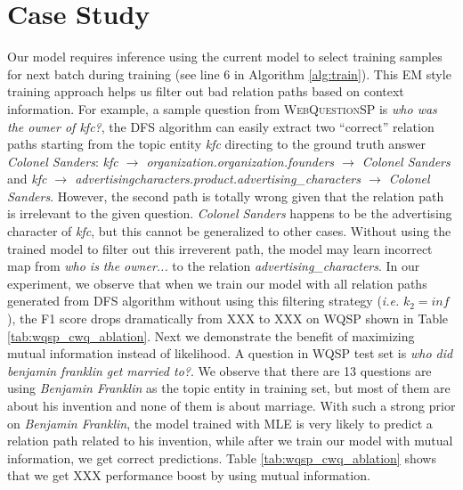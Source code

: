 \section{Case Study}


Our model requires inference using the current model to select training samples for next batch during training (see line 6 in Algorithm \ref{alg:train}). This EM style training approach helps us filter out bad relation paths based on context information. For example, a sample question from \textsc{WebQuestionSP} is \textit{who was the owner of kfc?}, the DFS algorithm can easily extract two ``correct'' relation paths starting from the topic entity \textit{kfc} directing to the ground truth answer \textit{Colonel Sanders}: \textit{kfc $\rightarrow$ organization.organization.founders $\rightarrow$ Colonel Sanders} and \textit{kfc $\rightarrow$ advertisingcharacters.product.advertising\_characters $\rightarrow$ Colonel Sanders}. However, the second path is totally wrong given that the relation path is irrelevant to the given question. \textit{Colonel Sanders} happens to be the advertising character of \textit{kfc}, but this cannot be generalized to other cases. Without using the trained model to filter out this irreverent path, the model may learn incorrect map from \textit{who is the owner...} to the relation \textit{advertising\_characters}. In our experiment, we observe that when we train our model with all relation paths generated from DFS algorithm without using this filtering strategy (\emph{i.e.} $k_2=inf$), the F1 score drops dramatically from XXX to XXX on WQSP shown in Table \ref{tab:wqsp_cwq_ablation}. Next we demonstrate the benefit of maximizing mutual information instead of likelihood. A question in WQSP test set is \textit{who did benjamin franklin get married to?}. We observe that there are 13 questions are using \textit{Benjamin Franklin} as the topic entity in training set, but most of them are about his invention and none of them is about marriage. With such a strong prior on \textit{Benjamin Franklin}, the model trained with MLE is very likely to predict a relation path related to his invention, while after we train our model with mutual information, we get correct predictions. Table \ref{tab:wqsp_cwq_ablation} shows that we get XXX performance boost by using mutual information.




